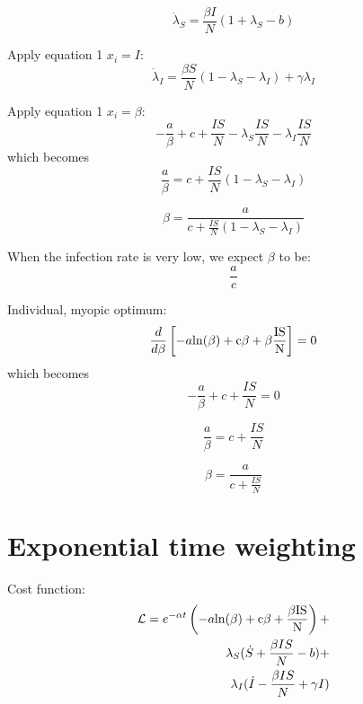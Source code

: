 \documentclass[11pt]{article} %
\begin{document}
\begin{equation}
\dot{\lambda}_S = \frac{\beta I}{N}(1 + \lambda_S-b)
\end{equation}

Apply equation 1 $x_i = I$:
\begin{equation}
\dot{\lambda}_I = \frac{\beta S}{N}(1-\lambda_S-\lambda_I)+\gamma \lambda_I
\end{equation}

Apply equation 1 $x_i = \beta$:
\begin{equation}
-\frac{a}{\beta}+c+\frac{IS}{N}-\lambda_S \frac{IS}{N}-\lambda_I \frac{IS}{N}
\end{equation}
which becomes
\begin{equation}
\frac{a}{\beta} = c + \frac{IS}{N}(1-\lambda_S-\lambda_I)
\end{equation}

\begin{equation}
\beta = \frac{a}{c+\frac{IS}{N}(1-\lambda_S-\lambda_I)}
\end{equation}


When the infection rate is very low, we expect $\beta$ to be:
\begin{equation}
\frac{a}{c}
\end{equation}


Individual, myopic optimum: 
\begin{equation}
\frac{d}{d \beta}\left[-a\rm{ln}({\beta})+c\beta+\beta\frac{ IS}{N}\right] = 0
\end{equation}
which becomes 
\begin{equation}
-\frac{a}{\beta}+c+\frac{IS}{N} = 0
\end{equation}

\begin{equation}
\frac{a}{\beta} = c+\frac{IS}{N}
\end{equation}

\begin{equation}
\beta = \frac{a}{c+\frac{IS}{N}}
\end{equation}

\section{Exponential time weighting}
Cost function:
\begin{equation}
\begin{split}
\mathcal{L} =e^{-\alpha t} \left(-a \rm {ln}({\beta})+c\beta+\frac{\beta IS}{N} \right)+\\
\lambda_S(\dot{S} +\frac{\beta IS}{N}-b)+\\
\lambda_I(\dot{I}-\frac{\beta IS}{N}+\gamma I)
\end{split}
\end{equation}
\end{document}
